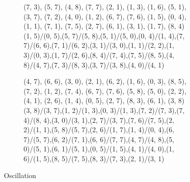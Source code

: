 \begin{figure}
  \centering
  \begin{subfigure}[b]{0.40\textwidth}
    \resizebox{\linewidth}{!} {
       {{(7, 3), (5, 7), (4, 8), (7, 7), (2, 1), (1, 3), (1, 6),
      (5, 1), (3, 7), (7, 2), (4, 0), (1, 2), (6, 7), (7, 6), (1, 5), (0, 4),
      (1, 1), (7, 1), (7, 5), (2, 7), (6, 1), (3, 1), (1, 7), (8, 4)}} {{{(1,
      5)/(0, 5)},{(5, 7)/(5, 8)},{(5, 1)/(5, 0)},{(0, 4)/(1, 4)},{(7, 7)/(6,
      6)},{(7, 1)/(6, 2)},{(3, 1)/(3, 0)},{(1, 1)/(2, 2)},{(1, 3)/(0, 3)},{(1,
      7)/(2, 6)},{(8, 4)/(7, 4)},{(7, 5)/(8, 5)},{(4, 8)/(4, 7)},{(7, 3)/(8,
      3)},{(3, 7)/(3, 8)},{(4, 0)/(4, 1)}}}
    }
  \end{subfigure}
  \begin{subfigure}[b]{0.40\textwidth}
    \resizebox{\linewidth}{!} {
       {{(4, 7), (6, 6), (3, 0), (2, 1), (6, 2), (1, 6), (0, 3),
      (8, 5), (7, 2), (1, 2), (7, 4), (6, 7), (7, 6), (5, 8), (5, 0), (2, 2),
      (4, 1), (2, 6), (1, 4), (0, 5), (2, 7), (8, 3), (6, 1), (3, 8)}} {{{(3,
      8)/(3, 7)},{(1, 2)/(1, 3)},{(0, 3)/(1, 3)},{(7, 2)/(7, 3)},{(7, 4)/(8,
      4)},{(3, 0)/(3, 1)},{(2, 7)/(3, 7)},{(7, 6)/(7, 5)},{(2, 2)/(1, 1)},{(5,
      8)/(5, 7)},{(2, 6)/(1, 7)},{(1, 4)/(0, 4)},{(6, 7)/(5, 7)},{(6, 2)/(7,
      1)},{(6, 6)/(7, 7)},{(4, 7)/(4, 8)},{(5, 0)/(5, 1)},{(6, 1)/(5, 1)},{(0,
      5)/(1, 5)},{(4, 1)/(4, 0)},{(1, 6)/(1, 5)},{(8, 5)/(7, 5)},{(8, 3)/(7,
      3)},{(2, 1)/(3, 1)}}}
    }
  \end{subfigure}
\caption{Oscillation}
\end{figure}

